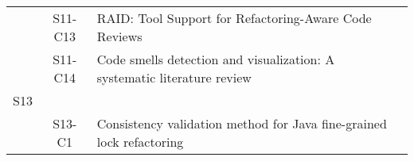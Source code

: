 \begin{longtable}{ccp{9cm}p{3cm}}
    & S11-C13 & RAID: Tool Support for Refactoring-Aware Code Reviews                                                                                                                                                                                          & \citeauthor*{Brito2021}       \\
    & S11-C14 & Code smells detection and visualization: A systematic literature review                                                                                                                                                                        & \citeauthor*{Pereira2022}     \\
S13 &        &                                                                                                                                                                                                                                               &                                 \\
    & S13-C1  & Consistency validation method for Java fine-grained lock refactoring                                                                                                                                                                           & \citeauthor*{Zhang2021b}         
\end{longtable}